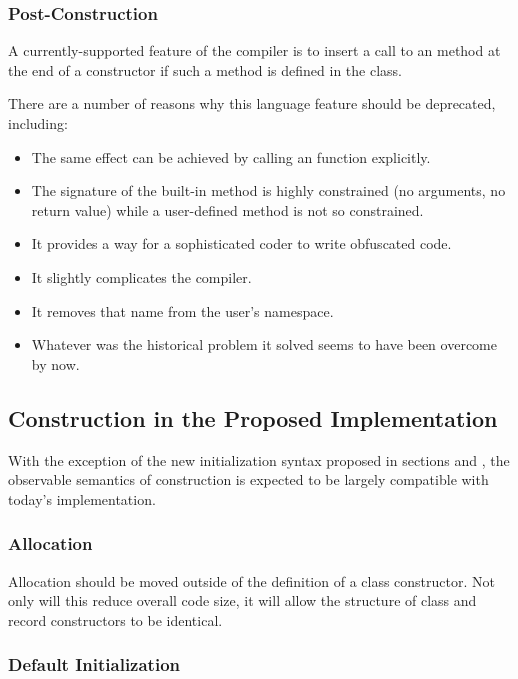 \subsubsection{Post-Construction}

A currently-supported feature of the compiler is to insert a call to an 
method at the end of a constructor if such a method is defined in the class.

There are a number of reasons why this language feature should be deprecated, including:
\begin{itemize}
\item The same effect can be achieved by calling an  function explicitly.
\item The signature of the built-in  method is highly constrained (no
  arguments, no return value) while a user-defined  method is not so
  constrained. 
\item It provides a way for a sophisticated coder to write obfuscated code.
\item It slightly complicates the compiler.
\item It removes that name from the user's namespace.
\item Whatever was the historical problem it solved seems to have been overcome by now.
\end{itemize}


\subsection{Construction in the Proposed Implementation}

With the exception of the new initialization syntax proposed in sections
 and , the observable semantics of construction is
expected to be largely compatible with today's implementation.  

\subsubsection{Allocation}

Allocation should be moved outside of the definition of a class constructor.  Not only
will this reduce overall code size, it will allow the structure of class and record
constructors to be identical.

\subsubsection{Default Initialization}

